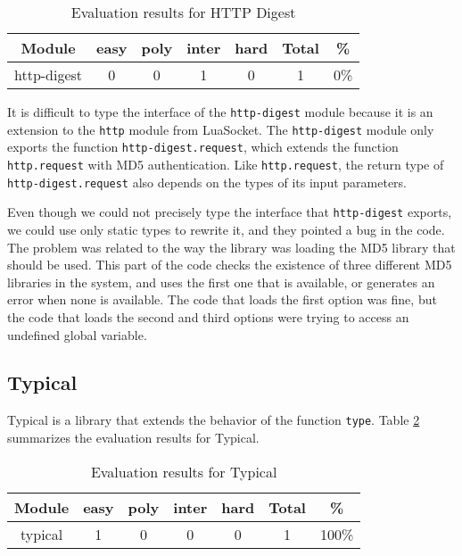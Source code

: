 \begin{table}[!ht]
\begin{center}
\begin{tabular}{|c|c|c|c|c|c|c|}
\hline
\textbf{Module} & \textbf{easy} & \textbf{poly} & \textbf{inter} & \textbf{hard} & \textbf{Total} & \textbf{\%} \\
\hline
http-digest & 0 & 0 & 1 & 0 & 1 & 0\% \\
\hline
\end{tabular}
\end{center}
\caption{Evaluation results for HTTP Digest}
\label{tab:evalhttpdigest}
\end{table}

It is difficult to type the interface of the \texttt{http-digest} module
because it is an extension to the \texttt{http} module from LuaSocket.
The \texttt{http-digest} module only exports the function
\texttt{http-digest.request}, which extends the function
\texttt{http.request} with MD5 authentication.
Like \texttt{http.request}, the return type of \texttt{http-digest.request}
also depends on the types of its input parameters.

Even though we could not precisely type the interface that \texttt{http-digest}
exports, we could use only static types to rewrite it, and they pointed a bug
in the code.
The problem was related to the way the library was loading the MD5 library
that should be used. 
This part of the code checks the existence of three different MD5 libraries
in the system, and uses the first one that is available, or generates an
error when none is available.
The code that loads the first option was fine, but the code that loads the
second and third options were trying to access an undefined global variable.

\subsection{Typical}

Typical is a library that extends the behavior of the function \texttt{type}. 
Table \ref{tab:evaltypical} summarizes the evaluation results for Typical.

\begin{table}[!ht]
\begin{center}
\begin{tabular}{|c|c|c|c|c|c|c|}
\hline
\textbf{Module} & \textbf{easy} & \textbf{poly} & \textbf{inter} & \textbf{hard} & \textbf{Total} & \textbf{\%} \\
\hline
typical & 1 & 0 & 0 & 0 & 1 & 100\% \\
\hline
\end{tabular}
\end{center}
\caption{Evaluation results for Typical}
\label{tab:evaltypical}
\end{table}

